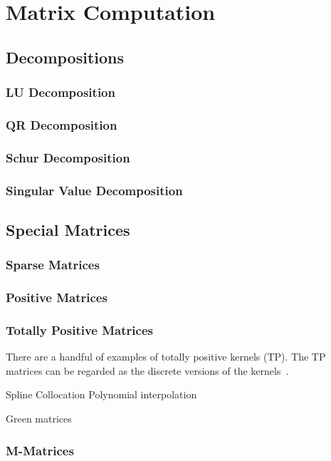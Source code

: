 \chapter{Matrix Computation}
\label{Ch: 8-Mat-Com}
\section{Decompositions}
\subsection{LU Decomposition}
\subsection{QR Decomposition}
\subsection{Schur Decomposition}
\subsection{Singular Value Decomposition}
\section{Special Matrices}
\subsection{Sparse Matrices}
\subsection{Positive Matrices}
\subsection{Totally Positive Matrices} 
    There are a handful of examples of totally positive kernels (TP). The TP matrices can be regarded as the discrete versions of the kernels~\cite{karlin1970total}. 
    \begin{example}
        Spline Collocation
Polynomial interpolation
    \end{example}
    \begin{example}
        Green matrices
    \end{example}


\subsection{M-Matrices}
